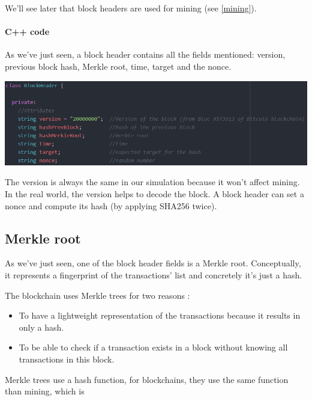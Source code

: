 We'll see later that block headers are used for mining (see \ref{mining}).

\begin{aside}

\paragraph{C++ code}

As we've just seen, a block header contains all the fields mentioned: version, previous block hash, Merkle root, time, target and the nonce. \newline

\includegraphics[width=14cm]{Figures/ClassBlockHeader}
\medskip

The version is always the same in our simulation because it won't affect mining. In the real world, the version helps to decode the block. A block header can set a nonce and compute its hash (by applying SHA256 twice).

\end{aside}
\medskip

  \subsection{Merkle root} \label{merkleRoot}

  As we've just seen, one of the block header fields is a Merkle root. Conceptually, it represents a fingerprint of the transactions' list and concretely it's just a hash.

  The blockchain uses Merkle trees for two reasons :

  \begin{itemize}
    \item To have a lightweight representation of the transactions because it results in only a hash.
    \item To be able to check if a transaction exists in a block without knowing all transactions in this block.
  \end{itemize}

  Merkle trees use a hash function, for blockchains, they use the same function than mining, which is

